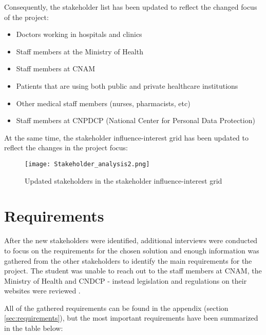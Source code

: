 Consequently, the stakeholder list has been updated to reflect the changed focus of the project:
\begin{itemize}
    \item Doctors working in hospitals and clinics
    \item Staff members at the Ministry of Health
    \item Staff members at CNAM
    \item Patients that are using both public and private healthcare institutions
    \item Other medical staff members (nurses, pharmacists, etc)
    \item Staff members at CNPDCP (National Center for Personal Data Protection)
\end{itemize}

At the same time, the stakeholder influence-interest grid has been updated to reflect the changes in the project focus:

\begin{figure}[ht]
    \centering
    \texttt{[image: Stakeholder\_analysis2.png]}
    \caption{Updated stakeholders in the stakeholder influence-interest grid}
    \label{fig:stakeholder_analysis2}
\end{figure}

\clearpage

\section{Requirements}

After the new stakeholders were identified, additional interviews were conducted to focus on the requirements for the chosen solution and enough information was gathered from the other stakeholders to identify the main requirements for the project. The student was unable to reach out to the staff members at CNAM, the Ministry of Health and CNDCP - instead legislation and regulations on their websites were reviewed \parencite{CNAM,CNPDCP,ministry}. 

All of the gathered requirements can be found in the appendix (section \ref{sec:requirements}), but the most important requirements have been summarized in the table below:

